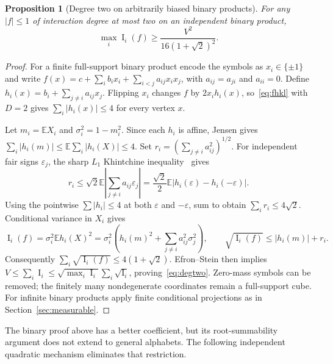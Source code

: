 \documentclass[11pt]{article}
\numberwithin{equation}{section}
\newtheorem{proposition}[theorem]{Proposition}
\theoremstyle{remark}
\newcommand{\E}{\mathbb E}
\newcommand{\Inf}{\operatorname{I}}
\begin{document}
\begin{proposition}[Degree two on arbitrarily biased binary products]\label{prop:degtwo}
For any $|f|\le1$ of interaction degree at most two on an independent binary product,
\begin{equation}\label{eq:degtwo}
 \max_i\Inf_i(f)\ge\frac{V^2}{16(1+\sqrt2)^2}.
\end{equation}
\end{proposition}
\begin{proof}
For a finite full-support binary product encode the symbols as $x_i\in\{\pm1\}$ and write
$ f(x)=c+\sum_ib_ix_i+\sum_{i<j}a_{ij}x_ix_j$, with $a_{ij}=a_{ji}$ and $a_{ii}=0$. Define
$h_i(x)=b_i+\sum_{j\ne i}a_{ij}x_j$. Flipping $x_i$ changes $f$ by $2x_ih_i(x)$, so~\eqref{eq:fhkl} with $D=2$ gives $\sum_i|h_i(x)|\le4$ for every vertex $x$.

Let $m_i=\E X_i$ and $\sigma_i^2=1-m_i^2$. Since each $h_i$ is affine, Jensen gives
$\sum_i|h_i(m)|\le\E\sum_i|h_i(X)|\le4$. Set
$r_i=(\sum_{j\ne i}a_{ij}^2)^{1/2}$. For independent fair signs $\varepsilon_j$, the sharp $L_1$ Khintchine inequality~\cite[Sect.~1]{Sza76} gives
\[
 r_i\le\sqrt2\E\left|\sum_{j\ne i}a_{ij}\varepsilon_j\right|
 =\frac{\sqrt2}{2}\E|h_i(\varepsilon)-h_i(-\varepsilon)|.
\]
Using the pointwise $\sum|h_i|\le4$ at both $\varepsilon$ and $-\varepsilon$, sum to obtain $\sum_ir_i\le4\sqrt2$. Conditional variance in $X_i$ gives
\[
 \Inf_i(f)=\sigma_i^2\E h_i(X)^2
 =\sigma_i^2\left(h_i(m)^2+\sum_{j\ne i}a_{ij}^2\sigma_j^2\right),
 \qquad \sqrt{\Inf_i(f)}\le|h_i(m)|+r_i.
\]
Consequently $\sum_i\sqrt{\Inf_i(f)}\le4(1+\sqrt2)$. Efron--Stein then implies
$V\le\sum_i\Inf_i\le\sqrt{\max_i\Inf_i}\sum_i\sqrt{\Inf_i}$, proving~\eqref{eq:degtwo}. Zero-mass symbols can be removed; the finitely many nondegenerate coordinates remain a full-support cube. For infinite binary products apply finite conditional projections as in Section~\ref{sec:measurable}.
\end{proof}
The binary proof above has a better coefficient, but its root-summability argument does not extend to general alphabets. The following independent quadratic mechanism eliminates that restriction.
\end{document}
